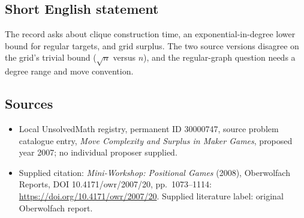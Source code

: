 \documentclass[11pt]{article}
\begin{document}
\subsection{Short English statement}
The record asks about clique construction time, an exponential-in-degree lower bound for regular targets, and grid surplus. The two source versions disagree on the grid's trivial bound ($\sqrt n$ versus $n$), and the regular-graph question needs a degree range and move convention.
\subsection{Sources}
\begin{itemize}\item Local UnsolvedMath registry, permanent ID 30000747, source problem catalogue entry, \emph{Move Complexity and Surplus in Maker Games}, proposed year 2007; no individual proposer supplied.\item Supplied citation: \emph{Mini-Workshop: Positional Games} (2008), Oberwolfach Reports, DOI 10.4171/owr/2007/20, pp.\ 1073--1114: \url{https://doi.org/10.4171/owr/2007/20}. Supplied literature label: original Oberwolfach report.\end{itemize}
\end{document}
